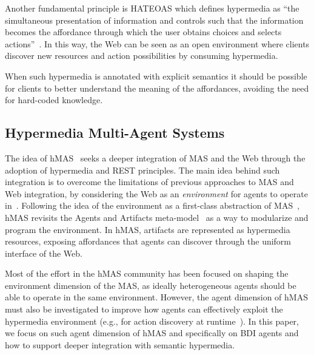 \documentclass[
]{ceurart}
\begin{document}
Another fundamental principle is \ac{HATEOAS} which defines hypermedia as ``the simultaneous presentation of information and controls such that the information becomes the affordance through which the user obtains choices and selects actions''~\cite{DBLP:journals/toit/FieldingT02}.
In this way, the Web can be seen as an open environment
where clients discover new resources and action possibilities by consuming hypermedia.

When such hypermedia is annotated with explicit semantics it should be possible for clients to better understand the meaning of the affordances, avoiding the need for hard-coded knowledge.
%


\subsection{Hypermedia Multi-Agent Systems}

The idea of \ac{hMAS}~\cite{DBLP:conf/atal/CiorteaMGBRZ19} seeks a deeper integration of \ac{MAS} and the Web through the adoption of hypermedia and \ac{REST} principles.
%
The main idea behind such integration is to overcome the limitations of previous approaches to \ac{MAS} and Web integration, by considering the Web as an \emph{environment} for agents to operate in~\cite{ciortea2018emas}.
%
Following the idea of the environment as a first-class abstraction of \ac{MAS}~\cite{weyns2007aamas},
\ac{hMAS} revisits the Agents and Artifacts meta-model~\cite{ricci2011aamas} as a way to modularize and program the environment.
%
In \ac{hMAS}, artifacts are represented as hypermedia resources, exposing affordances that agents can discover through the uniform interface of the Web.

Most of the effort in the \ac{hMAS} community has been focused on shaping the environment dimension of the \ac{MAS}, as ideally heterogeneous agents should be able to operate in the same environment.
%
However, the agent dimension of \ac{hMAS} must also be investigated to improve how agents can effectively exploit the hypermedia environment (e.g., for action discovery at runtime~\cite{vachtsevanou2024atal}).
%
In this paper, we focus on such agent dimension of \ac{hMAS} and specifically on \ac{BDI} agents and how to support deeper integration with semantic hypermedia.
\end{document}
